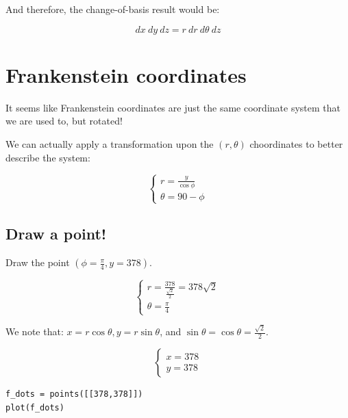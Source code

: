 \documentclass[letterpaper]{article}
\begin{document}
And therefore, the change-of-basis result would be:

\begin{equation}
   dx\ dy\ dz = r\ dr\ d\theta\ dz
\end{equation}

\section{Frankenstein coordinates}
\label{sec:org3ca113d}
It seems like Frankenstein coordinates are just the same coordinate system that we are used to, but rotated!

We can actually apply a transformation upon the \((r,\theta)\) choordinates to better describe the system:

\begin{equation}
\begin{cases}
   r = \frac{y}{\cos\phi} \\
   \theta = 90-\phi 
\end{cases}
\end{equation}

\subsection{Draw a point!}
\label{sec:org84734fa}
Draw the point \((\phi = \frac{\pi}{4}, y = 378)\).

\begin{equation}
\begin{cases}
   r = \frac{378}{\frac{\sqrt{2}}{2}} = 378\sqrt{2} \\
   \theta = \frac{\pi}{4}
\end{cases}
\end{equation}

We note that: \(x = r\cos\theta, y=r\sin\theta\), and \(\sin\theta = \cos\theta = \frac{\sqrt{2}}{2}\).

\begin{equation}
\begin{cases}
   x = 378\\
   y = 378
\end{cases}
\end{equation}

\begin{verbatim}
f_dots = points([[378,378]])
plot(f_dots)
\end{verbatim}
\end{document}
